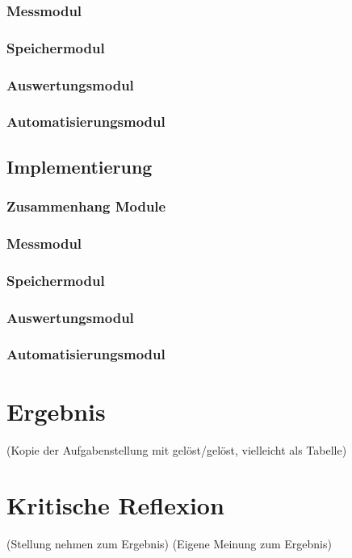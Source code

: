 \documentclass[
    load-dhbw-templates,
    load-preamble = true,
    auto-intro-pages = all,
    add-tocs-to-toc,
    debug = true,
    language = english,
    mainlanguage = ngerman,
    add-bibliography,
    bib-file = dhbw-source.bib,
    biblatex/style = numeric,
    print- = false
]{iodhbwm}
\begin{document}
        \subsection{Messmodul}
        \subsection{Speichermodul}
        \subsection{Auswertungsmodul}
        \subsection{Automatisierungsmodul}
    \section{Implementierung}
        \subsection{Zusammenhang Module}
        \subsection{Messmodul}
        \subsection{Speichermodul}
        \subsection{Auswertungsmodul}
        \subsection{Automatisierungsmodul}
    
\chapter{Ergebnis}
    (Kopie der Aufgabenstellung mit gelöst/gelöst, vielleicht als Tabelle)
    
\chapter{Kritische Reflexion}
    (Stellung nehmen zum Ergebnis)
    (Eigene Meinung zum Ergebnis)
\end{document}
